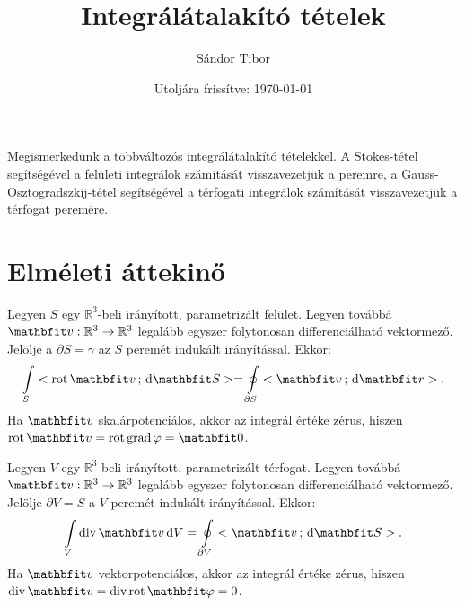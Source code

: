 \documentclass[lang=magyar]{math-handout}
\title{Integrálátalakító tételek}
\date{Utoljára frissítve: \today}
\author{Sándor Tibor}
\begin{document}
\allowdisplaybreaks

\maketitle

\vspace{1em}

\begin{summary}
  Megismerkedünk a többváltozós integrálátalakító tételekkel. A Stokes-tétel
  segítségével a felületi integrálok számítását visszavezetjük a peremre, a
  Gauss-Osz\-to\-grad\-szkij-tétel segítségével a térfogati integrálok számítását
  visszavezetjük a térfogat peremére.
\end{summary}

\vspace{-1em}

\section{Elméleti áttekinő}

\vspace{1em}

\begin{theorem}
  Legyen $S$ egy $\mathbb R^3$-beli irányított, parametrizált felület.
  Legyen továbbá $\rvec v : \mathbb R^3 \rightarrow \mathbb R^3$ legalább
  egyszer folytonosan differenciálható vektormező. Jelölje a $\partial S =
    \gamma$ az $S$ peremét indukált irányítással. Ekkor:
  \[
    \int \limits_S \scalar{\rot \rvec v}{\diff \rvec S}
    =
    \oint \limits_{\partial S} \scalar{\rvec v}{\diff \rvec r}
    \text.
  \]
  Ha $\rvec v$ skalárpotenciálos, akkor az integrál értéke zérus, hiszen
  $\rot \rvec v = \rot \grad \varphi = \rvec 0$.
\end{theorem}

\vfill

\begin{theorem}
  Legyen $V$ egy $\mathbb R^3$-beli irányított, parametrizált térfogat. Legyen
  továbbá $\rvec v : \mathbb R^3 \rightarrow \mathbb R^3$ legalább egyszer
  folytonosan differenciálható vektormező. Jelölje $\partial V = S$ a $V$
  peremét indukált irányítással. Ekkor:
  \[
    \int \limits_V \Div \rvec v \, \diff V
    =
    \oint \limits_{\partial V} \scalar{\rvec v}{\diff \rvec S}
    \text.
  \]
  Ha $\rvec v$ vektorpotenciálos, akkor az integrál értéke zérus, hiszen
  $\Div \rvec v = \Div \rot \rvec \varphi = 0$.
\end{theorem}
\end{document}
